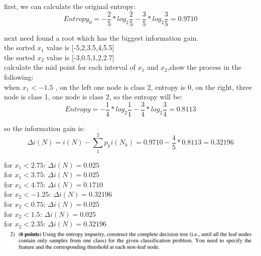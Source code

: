 \documentclass{article}
\begin{document}
first, we can calculate the original entropy:\\

\begin{equation*}
Entropy_0=-\frac{2}{5}*log_2{\frac{2}{5}}-\frac{3}{5}*log_2{\frac{3}{5}}=0.9710
\end{equation*}

next need found a root which has the biggest information gain.\\
the sorted $x_1$ value is [-5,2,3.5,4,5.5]\\
the sorted $x_2$ value is [-3,0.5,1,2,2.7]\\

calculate the mid point for each interval of $x_1$ and $x_2$,show the process in the following:\\

when $x_1<-1.5$ , on the left one node is class 2, entropy is 0, on the right, three node is class 1, one node is class 2, so the entropy will be:\\

\begin{equation*}
Entropy=-\frac{1}{4}*log_2{\frac{1}{1}}-\frac{3}{4}*log_2{\frac{3}{4}}=0.8113
\end{equation*}

so the information gain is:\\



\begin{equation*}
\Delta i(N)=i(N)-\sum_{1}^{2}p_ki(N_k)=0.9710 -\frac{4}{5}*0.8113=0.32196
\end{equation*}

for $x_1<2.75$: $\Delta i(N)=0.025$\\
for $x_1<3.75$: $\Delta i(N)=0.025$\\
for $x_1<4.75$: $\Delta i(N)=0.1710$\\
for $x_2<-1.25$: $\Delta i(N)=0.32196$\\
for $x_2<0.75$: $\Delta i(N)=0.025$\\
for $x_2<1.5$: $\Delta i(N)=0.025$\\
for $x_2<2.35$: $\Delta i(N)=0.32196$\\
\includegraphics[width=1\columnwidth]{problem3_2.png}
\end{document}
